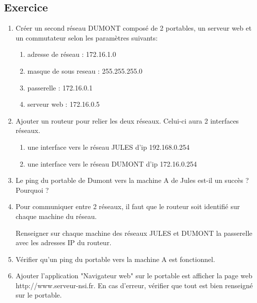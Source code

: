 \documentclass[11pt,a4paper]{article}
\newcounter{numexo}
\begin{document}
\subsection*{\Large Exercice \thenumexo }
\begin{enumerate}
\item Créer un second réseau DUMONT composé de 2 portables, un serveur web et un commutateur selon les paramètres suivants:
\begin{enumerate}
\item adresse de réseau : 172.16.1.0
\item masque de sous reseau : 255.255.255.0
\item passerelle : 172.16.0.1
\item serveur web : 172.16.0.5
\end{enumerate}
\item Ajouter un routeur pour relier les deux réseaux. Celui-ci aura 2 interfaces réseaux.
\begin{enumerate}
\item une interface vers le réseau JULES d'ip 192.168.0.254
\item une interface vers le réseau DUMONT d'ip 172.16.0.254
\end{enumerate}
\item Le ping du portable de Dumont vers la machine A de Jules est-il un succès ? Pourquoi ?
\item Pour communiquer entre 2 réseaux, il faut que le routeur soit identifié sur chaque machine du réseau. 

Renseigner sur chaque machine des réseaux JULES et DUMONT la passerelle avec les adresses IP du routeur.
\item Vérifier qu'un ping du portable vers la machine A est fonctionnel.
\item Ajouter l'application "Navigateur web" sur le portable est afficher la page web http://www.serveur-nsi.fr. En cas d'erreur, vérifier que tout est bien renseigné sur le portable.
\end{enumerate}
\end{document}

